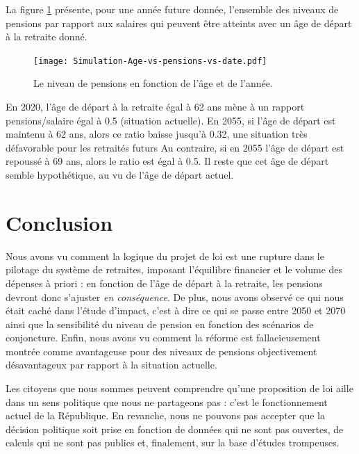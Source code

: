 \documentclass[10pt]{article}
\begin{document}
La figure \ref{fig-simulation-age-vs-pensions} présente, pour une année future donnée, 
l'ensemble des niveaux de pensions par rapport aux salaires qui peuvent être atteints avec 
un âge de départ à la retraite donné. 

\begin{figure}
\begin{center}
\texttt{[image: Simulation-Age-vs-pensions-vs-date.pdf]}
\end{center}

\caption{Le niveau de pensions en fonction de l'âge et de l'année.}
\label{fig-simulation-age-vs-pensions}
\end{figure}

En 2020, l'âge de départ à la retraite égal à 62 ans 
mène à un rapport pensions/salaire égal à 0.5 (situation actuelle).  
En 2055, si l'âge de départ est maintenu à 62 ans, alors ce ratio baisse jusqu'à 0.32, 
une situation très défavorable pour les retraités futurs
Au contraire, si en 2055 l'âge de départ est repoussé à 69 ans, 
alors le ratio est égal à 0.5. 
Il reste que cet âge de départ semble hypothétique, au vu de l'âge de départ actuel. 


\section{Conclusion}

Nous avons vu comment la logique du projet de loi est une 
rupture dans le pilotage du système de retraites, 
imposant l'équilibre financier et le volume des dépenses 
à priori : en fonction de l'âge de départ à la retraite, 
les pensions devront donc s'ajuster \emph{en conséquence}. 
De plus, nous avons observé ce qui nous était caché dans l'étude 
d'impact, c'est à dire ce qui se passe entre 2050 et 2070 ainsi que 
la sensibilité du niveau de pension en fonction des scénarios 
de conjoncture. 
Enfin, nous avons vu comment la réforme est fallacieusement 
montrée comme avantageuse pour des niveaux de pensions 
objectivement désavantageux par rapport à la situation 
actuelle. 

Les citoyens que nous sommes peuvent comprendre qu'une proposition de loi 
aille dans un sens politique que nous ne partageons pas : c'est le 
fonctionnement actuel de la République. 
En revanche, nous ne pouvons pas accepter que la décision politique soit 
prise en fonction de données qui ne sont pas ouvertes, 
de calculs qui ne sont pas publics et, finalement, sur la base d'études trompeuses. 
\end{document}
